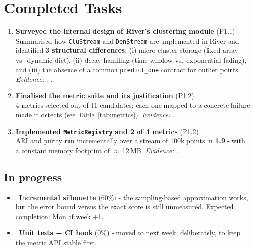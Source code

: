 \section{Completed Tasks}
\begin{enumerate}[label=\textbf{C\arabic*.},leftmargin=2.2em]
  \item \textbf{Surveyed the internal design of River's clustering module}
        \hfill{\small(P1.1)}\\
        Summarised how \texttt{CluStream} and \texttt{DenStream} are
        implemented in River and identified \textbf{3 structural differences}:
        (i) micro-cluster storage (fixed array vs.\ dynamic dict),
        (ii) decay handling (time-window vs.\ exponential fading), and
        (iii) the absence of a common \texttt{predict\_one} contract for
        outlier points.
        \emph{Evidence:} ,
        .

  \item \textbf{Finalised the metric suite and its justification}
        \hfill{\small(P1.2)}\\
        4 metrics selected out of 11 candidates; each one mapped to a
        concrete failure mode it detects (see Table~\ref{tab:metrics}).
        \emph{Evidence:} .

  \item \textbf{Implemented \texttt{MetricRegistry} and 2 of 4 metrics}
        \hfill{\small(P1.2)}\\
        ARI and purity run incrementally over a stream of 100k points in
        \textbf{1.9\,s} with a constant memory footprint of $\approx$\,12\,MB.
        \emph{Evidence:} .
\end{enumerate}

\subsection*{In progress}
\begin{itemize}
  \item \WIP\ \textbf{Incremental silhouette} (60\%) - the sampling-based
        approximation works, but the error bound versus the exact score is
        still unmeasured. Expected completion: Mon of week \number\numexpr\WeekNo+1\relax.
  \item \Planned\ \textbf{Unit tests + CI hook} (0\%) - moved to next week,
        deliberately, to keep the metric API stable first.
\end{itemize}

